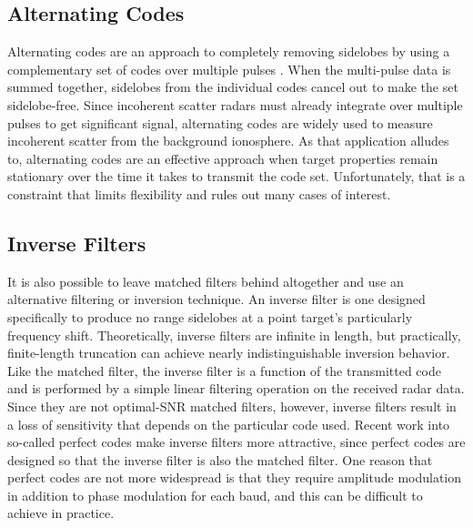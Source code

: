 \subsection{Alternating Codes}
Alternating codes are an approach to completely removing sidelobes by using a complementary set of codes over multiple pulses \autocite{LH87,Sul93,MVM08}. When the multi-pulse data is summed together, sidelobes from the individual codes cancel out to make the set sidelobe-free. Since incoherent scatter radars must already integrate over multiple pulses to get significant signal, alternating codes are widely used to measure incoherent scatter from the background ionosphere. As that application alludes to, alternating codes are an effective approach when target properties remain stationary over the time it takes to transmit the code set. Unfortunately, that is a constraint that limits flexibility and rules out many cases of interest.

\subsection{Inverse Filters}
It is also possible to leave matched filters behind altogether and use an alternative filtering or inversion technique. An inverse filter is one designed specifically to produce no range sidelobes at a point target's particularly frequency shift. Theoretically, inverse filters are infinite in length, but practically, finite-length truncation can achieve nearly indistinguishable inversion behavior. Like the matched filter, the inverse filter is a function of the transmitted code and is performed by a simple linear filtering operation on the received radar data. Since they are not optimal-SNR matched filters, however, inverse filters result in a loss of sensitivity that depends on the particular code used. Recent work into so-called perfect codes \autocite{LDPO09} make inverse filters more attractive, since perfect codes are designed so that the inverse filter is also the matched filter. One reason that perfect codes are not more widespread is that they require amplitude modulation in addition to phase modulation for each baud, and this can be difficult to achieve in practice.

